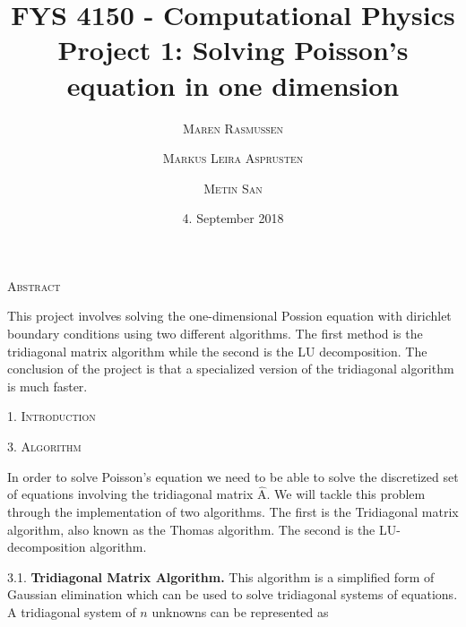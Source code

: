 \documentclass[a4paper,10pt,]{article}
\title{FYS 4150 - Computational Physics\\
 Project 1: Solving Poisson's equation in one dimension 
}
\date{\normalsize{4. September 2018} }
\author{
 \textsc{\small{Maren Rasmussen}}\and \textsc{\small{Markus Leira Asprusten}}\and \textsc{\small{Metin San}}
 }
\begin{document}
\maketitle

\begin{center}
\textsc{Abstract}
\end{center}

\begin{adjustwidth}{7mm}{7mm}

This project involves solving the one-dimensional Possion equation with dirichlet boundary conditions using two different algorithms. The first method is the tridiagonal matrix algorithm while the second is the LU decomposition. The conclusion of the project is that a specialized version of the tridiagonal algorithm is much faster.

\end{adjustwidth}



\bigskip

\begin{center}
\textsc{1. Introduction}
\end{center}

\blindtext
\newpage


\begin{center}
\textsc{3. Algorithm}
\end{center}
In order to solve Poisson's equation we need to be able to solve the discretized set of equations involving the tridiagonal matrix $\hat{\text{A}}$. We will tackle this problem through the implementation of two algorithms. The first is the Tridiagonal matrix algorithm, also known as the Thomas algorithm. The second is the LU-decomposition algorithm. 
\bigskip

3.1. \textbf{Tridiagonal Matrix Algorithm.} This algorithm is a simplified form of Gaussian elimination which can be used to solve tridiagonal systems of equations. A tridiagonal system of $n$ unknowns can be represented as 
\end{document}
